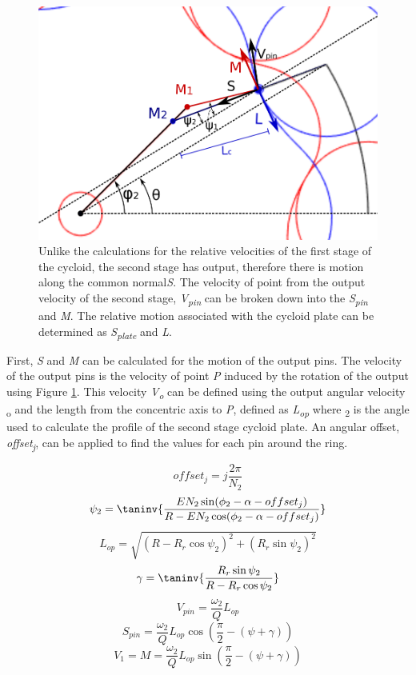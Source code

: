 \begin{figure}[h]
	\centering
	\includegraphics[width=0.50\linewidth]{fig/two_stage_vel_angles}
   \caption{Unlike the calculations for the relative velocities of the first stage of the cycloid, the second stage has output, therefore there is motion along the common normal\textit{S}. The velocity of point  from the output velocity of the second stage, \textit{V\textsubscript{pin}} can be broken down into the \textit{S\textsubscript{pin}} and \textit{M}. The relative motion associated with the cycloid plate can be determined as \textit{S\textsubscript{plate}} and \textit{L}.}
   \label{fig:dual_relative_motion}
\end{figure}

First, \textit{S} and \textit{M} can be calculated for the motion of the output pins. The velocity of the output pins is the velocity of point \textit{P} induced by the rotation of the output using Figure \ref{fig:dual_relative_motion}. This velocity \textit{V\textsubscript{o}} can be defined using the output angular velocity \textomega\textsubscript{o} and the length from the concentric axis to \textit{P}, defined as \textit{L\textsubscript{op}} where \textpsi\textsubscript{2} is the angle used to calculate the profile of the second stage cycloid plate. An angular offset, \textit{offset\textsubscript{j}}, can be applied to find the values for each pin around the ring. 

\begin{equation}\label{eq:offset2}
offset_j = j \frac{2\pi}{N_2}
\end{equation}
\begin{equation}\label{eq:psi2}
\psi_2 = \taninv{\frac{E N_2 \sin(\phi_2-\alpha-offset_j)}{R-E N_2\cos(\phi_2-\alpha-offset_j)}}
\end{equation}
\begin{equation} \label{eq:l_op}
L_{op} = \sqrt{(R-R_r\cos\psi_2)^2 + (R_r\sin\psi_2)^2}
\end{equation}
\begin{equation}
\gamma = \taninv{\frac{R_r\sin\psi_2}{R-R_r\cos\psi_2}}
\end{equation}
\begin{equation}
V_{pin} = \frac{\omega_2}{Q} L_{op}
\end{equation}
\begin{equation} \label{eq:s_pin}
S_{pin} = \frac{\omega_2}{Q} L_{op} \cos(\frac{\pi}{2}-(\psi+\gamma))
\end{equation}
\begin{equation}
V_{1} = M = \frac{\omega_2}{Q} L_{op} \sin(\frac{\pi}{2}-(\psi+\gamma))
\end{equation}


